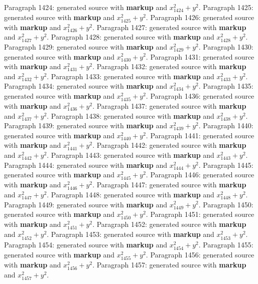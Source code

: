 \documentclass{article}
\begin{document}
Paragraph 1424: generated source with \textbf{markup} and $x_{1424}^2 + y^2$.
Paragraph 1425: generated source with \textbf{markup} and $x_{1425}^2 + y^2$.
Paragraph 1426: generated source with \textbf{markup} and $x_{1426}^2 + y^2$.
Paragraph 1427: generated source with \textbf{markup} and $x_{1427}^2 + y^2$.
Paragraph 1428: generated source with \textbf{markup} and $x_{1428}^2 + y^2$.
Paragraph 1429: generated source with \textbf{markup} and $x_{1429}^2 + y^2$.
Paragraph 1430: generated source with \textbf{markup} and $x_{1430}^2 + y^2$.
Paragraph 1431: generated source with \textbf{markup} and $x_{1431}^2 + y^2$.
Paragraph 1432: generated source with \textbf{markup} and $x_{1432}^2 + y^2$.
Paragraph 1433: generated source with \textbf{markup} and $x_{1433}^2 + y^2$.
Paragraph 1434: generated source with \textbf{markup} and $x_{1434}^2 + y^2$.
Paragraph 1435: generated source with \textbf{markup} and $x_{1435}^2 + y^2$.
Paragraph 1436: generated source with \textbf{markup} and $x_{1436}^2 + y^2$.
Paragraph 1437: generated source with \textbf{markup} and $x_{1437}^2 + y^2$.
Paragraph 1438: generated source with \textbf{markup} and $x_{1438}^2 + y^2$.
Paragraph 1439: generated source with \textbf{markup} and $x_{1439}^2 + y^2$.
Paragraph 1440: generated source with \textbf{markup} and $x_{1440}^2 + y^2$.
Paragraph 1441: generated source with \textbf{markup} and $x_{1441}^2 + y^2$.
Paragraph 1442: generated source with \textbf{markup} and $x_{1442}^2 + y^2$.
Paragraph 1443: generated source with \textbf{markup} and $x_{1443}^2 + y^2$.
Paragraph 1444: generated source with \textbf{markup} and $x_{1444}^2 + y^2$.
Paragraph 1445: generated source with \textbf{markup} and $x_{1445}^2 + y^2$.
Paragraph 1446: generated source with \textbf{markup} and $x_{1446}^2 + y^2$.
Paragraph 1447: generated source with \textbf{markup} and $x_{1447}^2 + y^2$.
Paragraph 1448: generated source with \textbf{markup} and $x_{1448}^2 + y^2$.
Paragraph 1449: generated source with \textbf{markup} and $x_{1449}^2 + y^2$.
Paragraph 1450: generated source with \textbf{markup} and $x_{1450}^2 + y^2$.
Paragraph 1451: generated source with \textbf{markup} and $x_{1451}^2 + y^2$.
Paragraph 1452: generated source with \textbf{markup} and $x_{1452}^2 + y^2$.
Paragraph 1453: generated source with \textbf{markup} and $x_{1453}^2 + y^2$.
Paragraph 1454: generated source with \textbf{markup} and $x_{1454}^2 + y^2$.
Paragraph 1455: generated source with \textbf{markup} and $x_{1455}^2 + y^2$.
Paragraph 1456: generated source with \textbf{markup} and $x_{1456}^2 + y^2$.
Paragraph 1457: generated source with \textbf{markup} and $x_{1457}^2 + y^2$.
\end{document}
